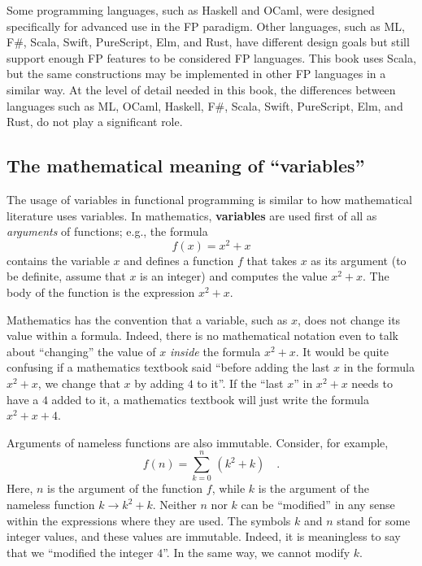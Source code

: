 Some programming languages, such as Haskell and OCaml, were designed
specifically for advanced use in the FP paradigm. Other languages,
such as ML, F\#, Scala, Swift, PureScript, Elm, and Rust, have different
design goals but still support enough FP features to be considered
FP languages. This book uses Scala, but the same constructions may
be implemented in other FP languages in a similar way. At the level
of detail needed in this book, the differences between languages such
as ML, OCaml, Haskell, F\#, Scala, Swift, PureScript, Elm, and Rust,
do not play a significant role.

\subsection{The mathematical meaning of \textsf{``}variables\textsf{''}}

The usage of variables in functional programming is similar to how
mathematical literature uses variables. In mathematics, \textbf{variables}
are used first of all as \emph{arguments} of functions; e.g., the
formula 
\[
f(x)=x^{2}+x
\]
contains the variable $x$ and defines a function $f$ that takes
$x$ as its argument (to be definite, assume that $x$ is an integer)
and computes the value $x^{2}+x$. The body of the function is the
expression $x^{2}+x$. 

Mathematics has the convention that a variable, such as $x$, does
not change its value within a formula. Indeed, there is no mathematical
notation even to talk about \textsf{``}changing\textsf{''} the value of $x$ \emph{inside}
the formula $x^{2}+x$. It would be quite confusing if a mathematics
textbook said \textsf{``}before adding the last $x$ in the formula $x^{2}+x$,
we change that $x$ by adding $4$ to it\textsf{''}. If the \textsf{``}last $x$\textsf{''}
in $x^{2}+x$ needs to have a $4$ added to it, a mathematics textbook
will just write the formula $x^{2}+x+4$.

Arguments of nameless functions are also immutable. Consider, for
example,
\[
f(n)=\sum_{k=0}^{n}\,(k^{2}+k)\quad.
\]
Here, $n$ is the argument of the function $f$, while $k$ is the
argument of the nameless function $k\rightarrow k^{2}+k$. Neither
$n$ nor $k$ can be \textsf{``}modified\textsf{''} in any sense within the expressions
where they are used. The symbols $k$ and $n$ stand for some integer
values, and these values are immutable. Indeed, it is meaningless
to say that we \textsf{``}modified the integer $4$\textsf{''}. In the same way, we
cannot modify $k$.

